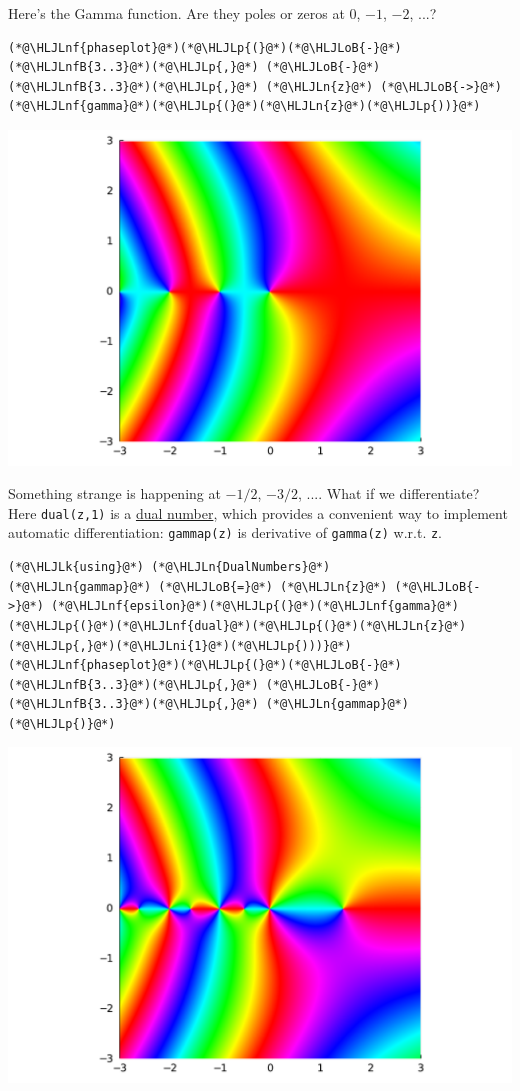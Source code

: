 \documentclass[12pt,a4paper]{article}
\newcommand{\HLJLk}[1]{\textcolor[RGB]{148,91,176}{\textbf{#1}}}
\newcommand{\HLJLn}[1]{#1}
\newcommand{\HLJLnf}[1]{\textcolor[RGB]{66,102,213}{#1}}
\newcommand{\HLJLnfB}[1]{\textcolor[RGB]{59,151,46}{#1}}
\newcommand{\HLJLni}[1]{\textcolor[RGB]{59,151,46}{#1}}
\newcommand{\HLJLoB}[1]{\textcolor[RGB]{102,102,102}{\textbf{#1}}}
\newcommand{\HLJLp}[1]{#1}
\begin{document}
Here's the Gamma function. Are they poles or zeros at 0, $-1$, $-2$, ...?


\begin{lstlisting}
(*@\HLJLnf{phaseplot}@*)(*@\HLJLp{(}@*)(*@\HLJLoB{-}@*)(*@\HLJLnfB{3..3}@*)(*@\HLJLp{,}@*) (*@\HLJLoB{-}@*)(*@\HLJLnfB{3..3}@*)(*@\HLJLp{,}@*) (*@\HLJLn{z}@*) (*@\HLJLoB{->}@*) (*@\HLJLnf{gamma}@*)(*@\HLJLp{(}@*)(*@\HLJLn{z}@*)(*@\HLJLp{))}@*)
\end{lstlisting}

\includegraphics[width=\linewidth]{figures/Lecture1_15_1.pdf}

Something strange is happening at $-1/2$, $-3/2$, .... What if we differentiate? Here \texttt{dual(z,1)} is a \href{https://en.wikipedia.org/wiki/Dual_number}{dual number}, which provides a convenient way to implement automatic differentiation: \texttt{gammap(z)} is derivative of \texttt{gamma(z)} w.r.t. \texttt{z}.


\begin{lstlisting}
(*@\HLJLk{using}@*) (*@\HLJLn{DualNumbers}@*)
(*@\HLJLn{gammap}@*) (*@\HLJLoB{=}@*) (*@\HLJLn{z}@*) (*@\HLJLoB{->}@*) (*@\HLJLnf{epsilon}@*)(*@\HLJLp{(}@*)(*@\HLJLnf{gamma}@*)(*@\HLJLp{(}@*)(*@\HLJLnf{dual}@*)(*@\HLJLp{(}@*)(*@\HLJLn{z}@*)(*@\HLJLp{,}@*)(*@\HLJLni{1}@*)(*@\HLJLp{)))}@*)
(*@\HLJLnf{phaseplot}@*)(*@\HLJLp{(}@*)(*@\HLJLoB{-}@*)(*@\HLJLnfB{3..3}@*)(*@\HLJLp{,}@*) (*@\HLJLoB{-}@*)(*@\HLJLnfB{3..3}@*)(*@\HLJLp{,}@*) (*@\HLJLn{gammap}@*)(*@\HLJLp{)}@*)
\end{lstlisting}

\includegraphics[width=\linewidth]{figures/Lecture1_16_1.pdf}
\end{document}
